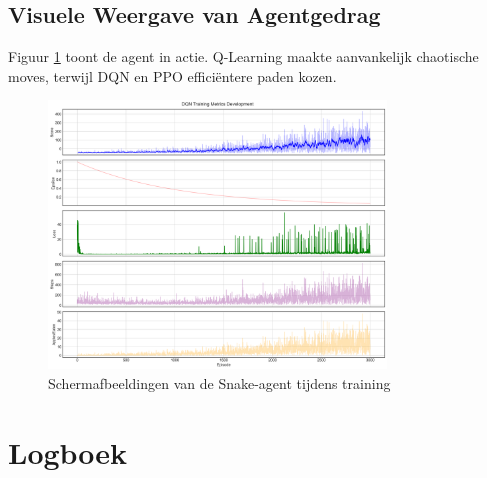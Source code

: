 \documentclass[a4paper,11pt]{report}
\begin{document}
\section{Visuele Weergave van Agentgedrag}
Figuur \ref{fig:snake_screenshots} toont de agent in actie. Q-Learning maakte
aanvankelijk chaotische moves, terwijl DQN en PPO efficiëntere paden kozen.

\begin{figure}[h]
    \centering
    \includegraphics[width=0.8\textwidth]{../Experimenten/Experiment1Snake/DQN/dqn_analysis.png}
    \caption{Schermafbeeldingen van de Snake-agent tijdens training}
    \label{fig:snake_screenshots}
\end{figure}

\chapter{Logboek}
\small
\end{document}
